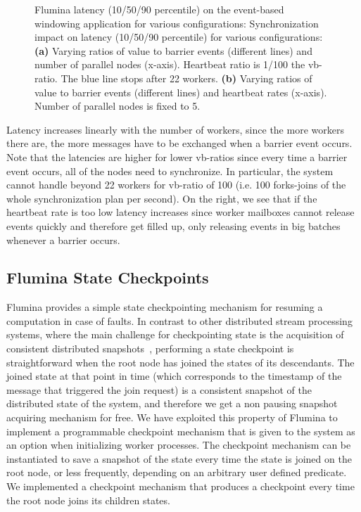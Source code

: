 \begin{figure}[t]
\begin{subfigure}[t]{0.45\columnwidth}
    \end{subfigure}
    \caption[Flumina (DGS) latency experiment.]{
    Flumina latency (10/50/90 percentile) on the event-based windowing application for various configurations:
    Synchronization impact on latency (10/50/90 percentile) for various configurations:
    \textbf{(a)}
    Varying ratios of value to barrier events (different lines) and number of parallel nodes (x-axis). Heartbeat ratio is 1/100 the vb-ratio. The blue line stops after 22 workers.
    \textbf{(b)} Varying ratios of value to barrier events (different lines) and heartbeat rates (x-axis). Number of parallel nodes is fixed to 5.
      }
    \label{dgs:fig:synchronization-overhead}
\end{figure}
Latency increases linearly with
the number of workers, since the more workers there are, the more
messages have to be exchanged when a barrier event occurs. Note that
the latencies are higher for lower vb-ratios since every time a barrier
event occurs, all of the nodes need to synchronize. In particular, the
system cannot handle beyond 22 workers for vb-ratio of 100 (i.e. 100
forks-joins of the whole synchronization plan per second). On the right,
we see that if the heartbeat rate is too low latency increases since worker mailboxes cannot release events quickly and therefore get filled up, only releasing events in big batches whenever a barrier occurs.

\subsection{Flumina State Checkpoints}

Flumina provides a simple state checkpointing mechanism
for resuming a computation in case of faults.
In contrast to other distributed stream processing systems, where the
main challenge for checkpointing state is the acquisition of
consistent distributed
snapshots~\cite{Naiad2013,Flink2017},
performing a state checkpoint is straightforward when the root
node has joined the states of its descendants.
The joined state at that point in time (which corresponds to
the timestamp of the message that triggered the join request) is a
consistent snapshot of the distributed state of the system, and
therefore we get a non pausing snapshot acquiring mechanism for free.
We have exploited this property of Flumina to implement a programmable
checkpoint mechanism that is given to the system as an option when
initializing worker processes. The checkpoint mechanism can be
instantiated to save a snapshot of the state every time the state is
joined on the root node, or less frequently, depending on an arbitrary
user defined predicate. We implemented a checkpoint mechanism that
produces a checkpoint every time the root node joins its children
states.

